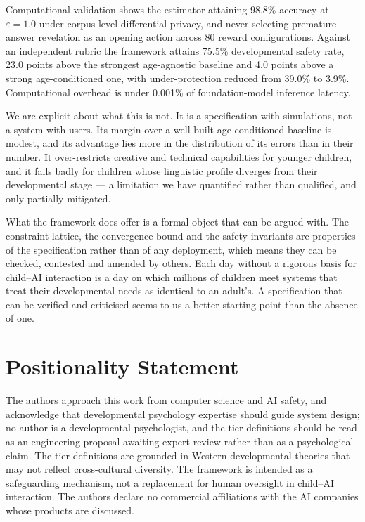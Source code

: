 \documentclass[fleqn,10pt]{wlscirep}
\begin{document}
Computational validation shows the estimator attaining 98.8\% accuracy at $\varepsilon = 1.0$ under corpus-level differential privacy, and never selecting premature answer revelation as an opening action across 80 reward configurations. Against an independent rubric the framework attains 75.5\% developmental safety rate, 23.0 points above the strongest age-agnostic baseline and 4.0 points above a strong age-conditioned one, with under-protection reduced from 39.0\% to 3.9\%. Computational overhead is under 0.001\% of foundation-model inference latency.

We are explicit about what this is not. It is a specification with simulations, not a system with users. Its margin over a well-built age-conditioned baseline is modest, and its advantage lies more in the distribution of its errors than in their number. It over-restricts creative and technical capabilities for younger children, and it fails badly for children whose linguistic profile diverges from their developmental stage --- a limitation we have quantified rather than qualified, and only partially mitigated.

What the framework does offer is a formal object that can be argued with. The constraint lattice, the convergence bound and the safety invariants are properties of the specification rather than of any deployment, which means they can be checked, contested and amended by others. Each day without a rigorous basis for child--AI interaction is a day on which millions of children meet systems that treat their developmental needs as identical to an adult's. A specification that can be verified and criticised seems to us a better starting point than the absence of one.



\section*{Positionality Statement}

The authors approach this work from computer science and AI safety, and acknowledge that developmental psychology expertise should guide system design; no author is a developmental psychologist, and the tier definitions should be read as an engineering proposal awaiting expert review rather than as a psychological claim. The tier definitions are grounded in Western developmental theories that may not reflect cross-cultural diversity. The framework is intended as a safeguarding mechanism, not a replacement for human oversight in child--AI interaction. The authors declare no commercial affiliations with the AI companies whose products are discussed.
\end{document}
